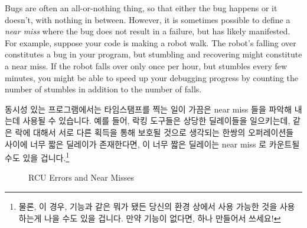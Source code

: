 Bugs are often an all-or-nothing thing, so that either the bug happens
or it doesn't, with nothing in between.
However, it is sometimes possible to define a \emph{near miss} where
the bug does not result in a failure, but has likely manifested.
For example, suppose your code is making a robot walk.
The robot's falling over constitutes a bug in your program, but
stumbling and recovering might constitute a near miss.
If the robot falls over only once per hour, but stumbles every few
minutes, you might be able to speed up your debugging progress by
counting the number of stumbles in addition to the number of falls.
\fi

동시성 있는 프로그램에서는 타임스탬프를 찍는 일이 가끔은 near miss 들을 파악해
내는데 사용될 수 있습니다.
예를 들어, 락킹 도구들은 상당한 딜레이들을 일으키는데, 같은 락에 대해서 서로
다른 획득을 통해 보호될 것으로 생각되는 한쌍의 오퍼레이션들 사이에 너무 짧은
딜레이가 존재한다면, 이 너무 짧은 딜레이는 near miss 로 카운트될 수도 있을
겁니다.\footnote{
	물론, 이 경우,  기능과 같은 뭐가 됐든 당신의 환경
	상에서 사용 가능한 것을 사용하는게 나을 수도 있을 겁니다.
	만약  기능이 없다면, 하나 만들어서 쓰세요!}

\begin{figure}[tbp]
\centering
{}
\caption{RCU Errors and Near Misses}
\label{fig:debugging:RCU Errors and Near Misses}
\end{figure}


